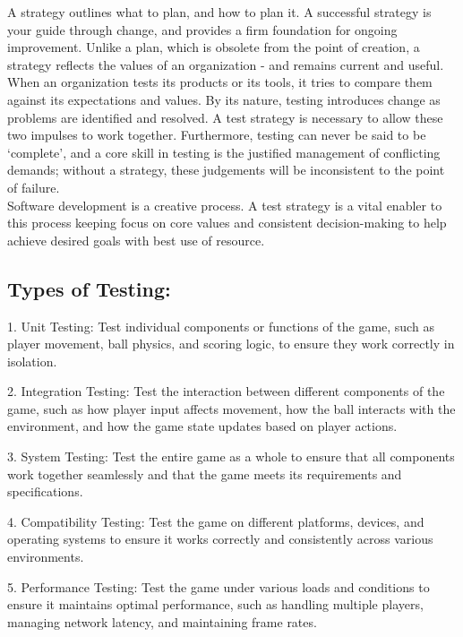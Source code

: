 \documentclass[12pt]{report}
\begin{document}
A strategy outlines what to plan, and how to plan it. A successful strategy is your guide 
through change, and provides a firm foundation for ongoing improvement. Unlike a plan, 
which is obsolete from the point of creation, a strategy reflects the values of an organization 
- and remains current and useful. When an organization tests its products or its tools, it tries 
to compare them against its expectations and values. By its nature, testing introduces change 
as problems are identified and resolved. A test strategy is necessary to allow these two 
impulses to work together. Furthermore, testing can never be said to be ‘complete’, and a 
core skill in testing is the justified management of conflicting demands; without a strategy, 
these judgements will be inconsistent to the point of failure.\\
Software development is a creative process. A test strategy is a vital enabler to this process 
keeping focus on core values and consistent decision-making to help achieve desired goals 
with best use of resource. 

\subsection{ Types of Testing:
}
\justifying
\setlength{\parindent}{4em}
\setlength{\parskip}{0.5em}
\renewcommand{\baselinestretch}{1.5}
\normalsize

\hspace{1.7 cm} 1. Unit Testing:
Test individual components or functions of the game, such as player movement, ball physics, and scoring logic, to ensure they work correctly in isolation.

2. Integration Testing:
Test the interaction between different components of the game, such as how player input affects movement, how the ball interacts with the environment, and how the game state updates based on player actions.

3. System Testing:
Test the entire game as a whole to ensure that all components work together seamlessly and that the game meets its requirements and specifications.

4. Compatibility Testing:
Test the game on different platforms, devices, and operating systems to ensure it works correctly and consistently across various environments.

5. Performance Testing:
Test the game under various loads and conditions to ensure it maintains optimal performance, such as handling multiple players, managing network latency, and maintaining frame rates.
\end{document}
